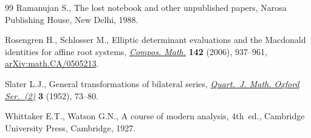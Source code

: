 \documentclass[pdftex]{sigma}
\numberwithin{equation}{section}
\begin{document}
\begin{thebibliography}{99}
Ramanujan S., The lost notebook and other unpublished papers, Narosa Publishing
 House, New Delhi, 1988.

Rosengren H., Schlosser M., Elliptic determinant evaluations and the
 {M}acdonald identities for affine root systems,
 \href{https://doi.org/10.1112/S0010437X0600203X}{\textit{Compos. Math.}}
 \textbf{142} (2006), 937--961,
 \href{http://arxiv.org/abs/math.CA/0505213}{arXiv:math.CA/0505213}.

Slater L.J., General transformations of bilateral series,
 \href{https://doi.org/10.1093/qmath/3.1.73}{\textit{Quart.~J. Math. Oxford
 Ser.~(2)}} \textbf{3} (1952), 73--80.

Whittaker E.T., Watson G.N., A course of modern analysis, 4th~ed., Cambridge University Press,  Cambridge, 1927.

\end{thebibliography}\LastPageEnding
\end{document}
